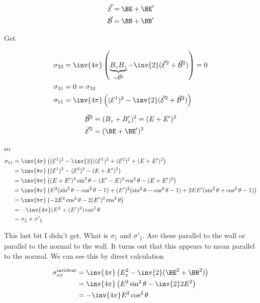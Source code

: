 \begin{align}\label{eqn:relativisticElectrodynamicsT9:150}
\vec{\mathcal{E}} &= \BE + \BE' \\
\vec{\mathcal{B}} &= \BB + \BB'
\end{align}

Get 

\begin{align}\label{eqn:relativisticElectrodynamicsT9:170}
\sigma_{3 3} &= \inv{4 \pi} \left( \underbrace{B_z B_z}_{=\vec{\mathcal{B}}^2} - \inv{2} (\vec{\mathcal{E}}^2 + \vec{\mathcal{B}}^2) \right) = 0 \\
\sigma_{3 1} &= 0 = \sigma_{3 2} \\
\sigma_{1 1} &= \inv{4 \pi} \left( (\mathcal{E}^1)^2 - \inv{2} (\vec{\mathcal{E}}^2 + \vec{\mathcal{B}}^2) \right) 
\end{align}

\begin{align}\label{eqn:relativisticElectrodynamicsT9:190}
\vec{\mathcal{B}}^2 &= (B_z + B_z')^2 = (E + E')^2 \\
\vec{\mathcal{E}}^2 &= (\BE + \BE')^2
\end{align}

so
\begin{align*}
\sigma_{1 1} 
&= \inv{4 \pi} \left( (\mathcal{E}^1)^2 - \inv{2} ((\mathcal{E}^1)^2 + (\mathcal{E}^2)^2 + (E + E')^2 \right) \\
&= \inv{8 \pi} \left( (\mathcal{E}^1)^2 - (\mathcal{E}^2)^2 - (E + E')^2 \right) \\
&= \inv{8 \pi} \left( 
(E + E')^2 \sin^2\theta 
-(E' - E)^2 \cos^2\theta -(E + E')^2
\right) \\
&= \inv{8 \pi} \left( 
E^2( \sin^2\theta - \cos^2\theta - 1)
+(E')^2( \sin^2\theta - \cos^2\theta - 1)
+ 2 E E' (\sin^2\theta + \cos^2\theta -1 )
\right) \\
&= \inv{8 \pi} \left( - 2 E^2 \cos^2\theta - 2 (E')^2 \cos^2\theta \right) \\
&= -\inv{4 \pi} (E^2 + (E')^2) \cos^2\theta \\
&= \sigma_\parallel + {\sigma'}_\parallel
\end{align*}

This last bit I didn't get.  What is $\sigma_\parallel$ and ${\sigma'}_\parallel$.  Are these parallel to the wall or parallel to the normal to the wall.  It turns out that this appears to mean parallel to the normal.  We can see this by direct calculation

\begin{align*}
\sigma_{x x}^{\text{incident}} 
&= \inv{4 \pi} \left( 
E_x^2 - \inv{2} (\BE^2 + \BB^2)
\right) \\
&= \inv{4 \pi} \left( 
E^2 \sin^2 \theta - \inv{2} 2 E^2 
\right) \\
&= -\inv{4 \pi} E^2 \cos^2\theta
\end{align*}

